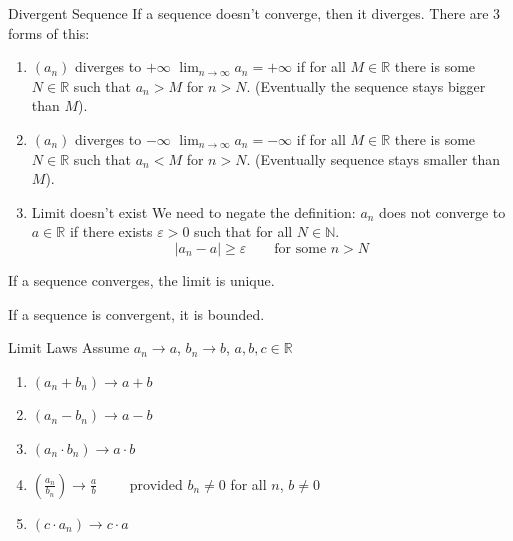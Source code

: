\documentclass[12pt]{article}
\begin{document}
\begin{definition}{Divergent Sequence}{}
    If a sequence doesn't converge, then it diverges. There are 3 forms of this:
    \begin{enumerate}
        \item $ \left( a_n \right) $ diverges to $ + \infty $
        \medskip
        \newline
        $ \lim_{n \to \infty} a_n = + \infty $ if for all $ M \in \mathbb{R} $ there is some $ N \in \mathbb{R} $ such that $ a_n > M $ for $ n > N $. (Eventually the sequence stays bigger than $ M $).
        \item $ \left( a_n \right) $ diverges to $ - \infty $
        \medskip
        \newline
        $ \lim_{n \to \infty} a_n = - \infty $ if for all $ M \in \mathbb{R} $ there is some $ N \in \mathbb{R} $ such that $ a_n < M $ for $ n > N $. (Eventually sequence stays smaller than $ M $).
        \item Limit doesn't exist
        \medskip
        \newline
        We need to negate the definition: $ a_n $ does not converge to $ a \in \mathbb{R} $ if there exists $ \varepsilon > 0 $ such that for all $ N \in \mathbb{N} $.
        \[ | a_n - a | \geq \varepsilon \qquad \text{for some } n > N \]
    \end{enumerate}
\end{definition}
\begin{proposition}{}{}
    If a sequence converges, the limit is unique.
\end{proposition}
\begin{proposition}{}{}
    If a sequence is convergent, it is bounded.
\end{proposition}
\begin{laws}{Limit Laws}{}
    Assume $ a_n \to a $, $ b_n \to b $, $ a,b,c \in \mathbb{R} $
    \begin{enumerate}
        \item $ \left( a_n + b_n \right) \to a + b $
        \item $ \left( a_n - b_n \right) \to a - b $
        \item $ \left( a_n \cdot b_n \right) \to a \cdot b $
        \item $ \left( \frac{a_n}{b_n} \right) \to \frac{a}{b} \qquad $ provided $ b_n \neq 0 $ for all $ n $, $ b \neq 0 $
        \item $ \left( c \cdot a_n \right) \to c \cdot a $
    \end{enumerate}
\end{laws}
\end{document}
